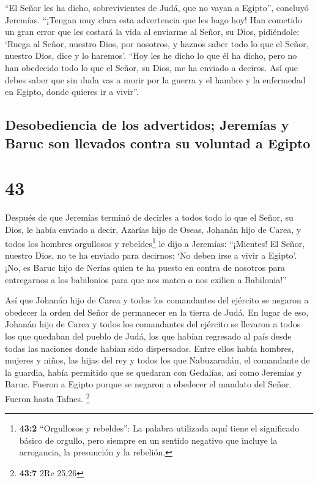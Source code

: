 ``El Señor les ha dicho, sobrevivientes de Judá, que no
vayan a Egipto'', concluyó Jeremías. ``¡Tengan muy clara esta
advertencia que les hago hoy!  Han cometido un gran error
que les costará la vida al enviarme al Señor, su Dios, pidiéndole:
`Ruega al Señor, nuestro Dios, por nosotros, y haznos saber todo lo que
el Señor, nuestro Dios, dice y lo haremos'.  ``Hoy les he
dicho lo que él ha dicho, pero no han obedecido todo lo que el Señor, su
Dios, me ha enviado a deciros.  Así que debes saber que
sin duda vas a morir por la guerra y el hambre y la enfermedad en
Egipto, donde quieres ir a vivir''.

\hypertarget{desobediencia-de-los-advertidos-jeremuxedas-y-baruc-son-llevados-contra-su-voluntad-a-egipto}{%
\subsection{Desobediencia de los advertidos; Jeremías y Baruc son
llevados contra su voluntad a
Egipto}\label{desobediencia-de-los-advertidos-jeremuxedas-y-baruc-son-llevados-contra-su-voluntad-a-egipto}}

\hypertarget{section-42}{%
\section{43}\label{section-42}}

 Después de que Jeremías terminó de decirles a todos todo
lo que el Señor, su Dios, le había enviado a decir, 
Azarías hijo de Oseas, Johanán hijo de Carea, y todos los hombres
orgullosos y rebeldes\footnote{\textbf{43:2} ``Orgullosos y rebeldes'':
  La palabra utilizada aquí tiene el significado básico de orgullo, pero
  siempre en un sentido negativo que incluye la arrogancia, la
  presunción y la rebelión.} le dijo a Jeremías: ``¡Mientes! El Señor,
nuestro Dios, no te ha enviado para decirnos: `No deben irse a vivir a
Egipto'.  ¡No, es Baruc hijo de Nerías quien te ha puesto
en contra de nosotros para entregarnos a los babilonios para que nos
maten o nos exilien a Babilonia!''

 Así que Johanán hijo de Carea y todos los comandantes del
ejército se negaron a obedecer la orden del Señor de permanecer en la
tierra de Judá.  En lugar de eso, Johanán hijo de Carea y
todos los comandantes del ejército se llevaron a todos los que quedaban
del pueblo de Judá, los que habían regresado al país desde todas las
naciones donde habían sido dispersados.  Entre ellos había
hombres, mujeres y niños, las hijas del rey y todos los que Nabuzaradán,
el comandante de la guardia, había permitido que se quedaran con
Gedalías, así como Jeremías y Baruc.  Fueron a Egipto
porque se negaron a obedecer el mandato del Señor. Fueron hasta Tafnes.
\footnote{\textbf{43:7} 2Re 25,26}

